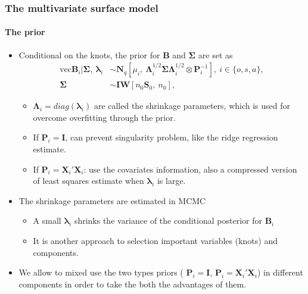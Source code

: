 \documentclass[10pt]{beamer}
\begin{document}
\begin{frame}
  \frametitle{The multivariate surface model}
  \framesubtitle{The prior}
  \begin{itemize}
  \item Conditional on the knots, the prior for $\bm{B}$ and
    $\bm{\Sigma}$ are set as
    \[
    \begin{split}
      \mathrm{vec}\bm{B}_i |\bm{\Sigma},~\bm{\lambda}_i &\sim \bm{N}_q\left[
        \mu _i, ~\bm{\Lambda}_i^{1/2} \bm{\Sigma} \bm{\Lambda}_i^{1/2} \otimes
        \bm{P}_i^{-1}
      \right], ~i\in \{o,s,a \},\\
      \bm{\Sigma} &\sim \bm{IW} \left[n_0 \bm{S}_0,~n_0\right],
    \end{split}
    \]
    \begin{itemize}

    \item $\bm{\Lambda}_i=diag(\bm{\lambda}_i)$ are called the shrinkage parameters,
      which is used for overcome overfitting through the prior.
    \item If $\bm{P}_i=\bm{I}$, can
      prevent singularity problem, like the ridge regression estimate.

    \item If $\bm{P}_i=\bm{X}_i'\bm{X}_i$: use the covariates
      information, also a compressed version of least squares estimate when
      $\bm{\lambda}_i$ is large.
    \end{itemize}
  \item The shrinkage parameters are estimated in MCMC
    \begin{itemize}
    \item A small $\bm{\lambda}_{i}$ shrinks the variance of the conditional posterior
      for $\bm{B}_i$
    \item It is another approach to selection important variables (knots) and
      components.
    \end{itemize}
  \item We allow to mixed use the two types priors ( $\bm{P}_i=\bm{I}$,
    $\bm{P}_i=\bm{X}_i'\bm{X}_i$) in different components in order to take the both
    the advantages of them.
  \end{itemize}
\end{frame}
\end{document}

